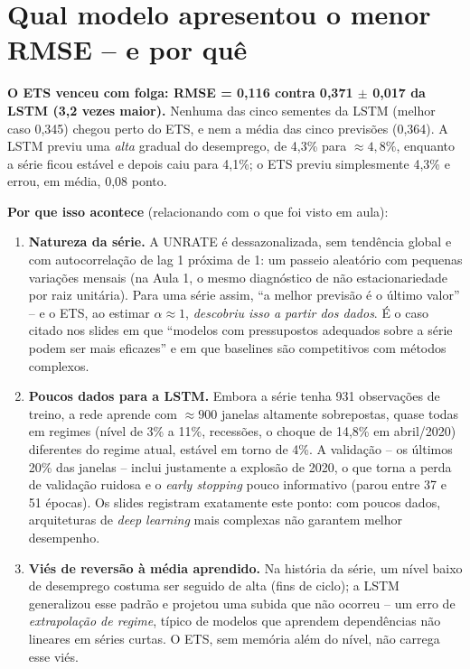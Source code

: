 \documentclass[11pt,a4paper]{article}
\begin{document}
\section{Qual modelo apresentou o menor RMSE -- e por quê}
\begin{resposta}
\textbf{O ETS venceu com folga: RMSE = 0,116 contra 0,371 $\pm$ 0,017 da LSTM (3,2 vezes maior).} Nenhuma das cinco sementes da LSTM (melhor caso 0,345) chegou perto do ETS, e nem a média das cinco previsões (0,364). A LSTM previu uma \emph{alta} gradual do desemprego, de 4,3\% para $\approx 4{,}8\%$, enquanto a série ficou estável e depois caiu para 4,1\%; o ETS previu simplesmente 4,3\% e errou, em média, 0,08 ponto.

\textbf{Por que isso acontece} (relacionando com o que foi visto em aula):
\begin{enumerate}[leftmargin=*]
\item \textbf{Natureza da série.} A UNRATE é dessazonalizada, sem tendência global e com autocorrelação de lag 1 próxima de 1: um passeio aleatório com pequenas variações mensais (na Aula 1, o mesmo diagnóstico de não estacionariedade por raiz unitária). Para uma série assim, ``a melhor previsão é o último valor'' -- e o ETS, ao estimar $\alpha \approx 1$, \emph{descobriu isso a partir dos dados}. É o caso citado nos slides em que ``modelos com pressupostos adequados sobre a série podem ser mais eficazes'' e em que baselines são competitivos com métodos complexos.
\item \textbf{Poucos dados para a LSTM.} Embora a série tenha 931 observações de treino, a rede aprende com $\approx 900$ janelas altamente sobrepostas, quase todas em regimes (nível de 3\% a 11\%, recessões, o choque de 14,8\% em abril/2020) diferentes do regime atual, estável em torno de 4\%. A validação -- os últimos 20\% das janelas -- inclui justamente a explosão de 2020, o que torna a perda de validação ruidosa e o \textit{early stopping} pouco informativo (parou entre 37 e 51 épocas). Os slides registram exatamente este ponto: com poucos dados, arquiteturas de \textit{deep learning} mais complexas não garantem melhor desempenho.
\item \textbf{Viés de reversão à média aprendido.} Na história da série, um nível baixo de desemprego costuma ser seguido de alta (fins de ciclo); a LSTM generalizou esse padrão e projetou uma subida que não ocorreu -- um erro de \emph{extrapolação de regime}, típico de modelos que aprendem dependências não lineares em séries curtas. O ETS, sem memória além do nível, não carrega esse viés.

\end{enumerate}
\end{resposta}
\end{document}
